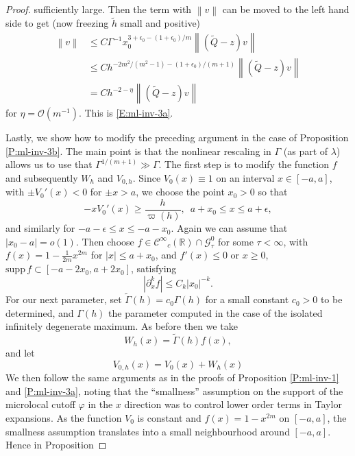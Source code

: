 \documentclass[twoside, final]{amsart}
\theoremstyle{definition}
\numberwithin{equation}{section}
\begin{document}
\begin{proof}
sufficiently large.
Then the term with ${{\left\lVert{{v}}\right\rVert}}$ can be moved to the
left hand side to get (now freezing ${\tilde{h}}$ small and positive)
\begin{align*}
{{\left\lVert{{v}}\right\rVert}} & {\leqslant} C \Gamma^{-1} x_0^{ 3 +
  \epsilon_0 - (1 +
  \epsilon_0)/m  } {{\left\lVert{{({\widetilde{Q}} -z) v }}\right\rVert}} \\
& {\leqslant}  C 
h^{ -2m^2/(m^2-1) -  (1+ \epsilon_0) /(m+1)} {{\left\lVert{{({\widetilde{Q}} -z) v }}\right\rVert}}
\\
& = C h^{-2-\eta} {{\left\lVert{{({\widetilde{Q}} -z) v }}\right\rVert}}
\end{align*}
for $\eta = {{\mathcal O}}(m^{-1})$.  
This is \eqref{E:ml-inv-3a}.

Lastly, we show how to modify the preceding argument in the case of
Proposition \ref{P:ml-inv-3b}.  The main point is that the nonlinear
rescaling in $\Gamma$ (as part of $\lambda$) allows us to use that
$\Gamma^{1/(m+1)} \gg \Gamma$.  The first step is to modify the function $f$
and subsequently $W_h$ and $V_{0,h}$.  Since $V_0(x) \equiv 1$ on an
interval $x \in [-a,a]$, with $\pm V_0'(x) <0$ for $\pm x > a$, we
choose the point $x_0>0$ so that
\[
- x V_0'( x ) {\geqslant} \frac{ h}{\varpi(h)}, \,\, \, a+x_0  {\leqslant}  x  {\leqslant}
a + \epsilon,
\]
and similarly for $-a-\epsilon {\leqslant} x {\leqslant} -a-x_0$.  
Again we can assume that $| x_0 - a| = o(1)$.  Then choose $f \in {{\mathcal C}^\infty}_c({{\mathbb R}}) \cap {\mathcal{G}}^0_\tau$ for some $\tau
< \infty$, with $f(x) = 1 - \frac{1}{2m}
x^{2m}$ for $| x | {\leqslant} a + x_0 $, and $f' (x) {\leqslant} 0$ or $x {\geqslant} 0$, ${\mathrm{supp}\,}
f \subset [-a-2x_0, a + 2x_0]$, satisfying
\[
| \partial_x^k f | {\leqslant} C_k |x_0|^{-k}.
\]
For
our next parameter, set ${\widetilde{\Gamma}}(h) = c_0 \Gamma(h)$ for a small
constant $c_0>0$ to be determined, and $\Gamma(h)$ the parameter
computed in the case of the isolated infinitely degenerate maximum.  As before then we take 
\[
W_h(x) = {\widetilde{\Gamma}}(h) f(x),
\]
and let
\[
V_{0,h}(x) = V_0(x) + W_h(x)
\]
We then follow the same arguments as in the proofs of Proposition
\ref{P:ml-inv-1} and \ref{P:ml-inv-3a}, noting that the ``smallness''
assumption on the support of the microlocal cutoff ${\varphi}$ in the $x$
direction was to control lower order terms in Taylor expansions.  As
the function $V_0$ is constant and $f(x) = 1-x^{2m}$ on $[-a,a]$, the smallness assumption
translates into a small neighbourhood around $[-a,a]$.  Hence in Proposition

\end{proof}
\end{document}
